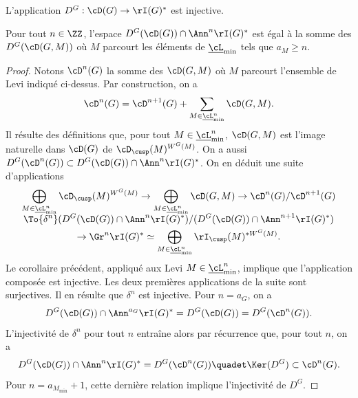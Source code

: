 \skpt
\begin{prop*}
\begin{enumeratei}
\item\label{injectivitei}
L'application $D^G:\cD(G)\to \rI(G)^*$ est injective.

\item\label{injectiviteii}
Pour tout $n\in \ZZ$, l'espace $D^G(\cD(G))\cap \Ann^n\rI(G)^*$ est égal à la somme des $D^G(\cD(G,M))$ où $M$ parcourt les éléments de $\underline{\cL}_{\min}$ tels que $a_{M}\geq n$.
\end{enumeratei}
\end{prop*}

\begin{proof}
Notons $\cD^n(G)$ la somme des $\cD(G,M)$ où $M$ parcourt l'ensemble de Levi indiqué ci-dessus. Par construction, on a
\[
\cD^n(G)=\cD^{n+1}(G)+\sum_{M\in \underline{\cL}^n_{\min}}\cD(G,M).
\]
Il résulte des définitions que, pour tout $M\in \underline{\cL}^n_{\min}$, $\cD(G,M)$ est l'image naturelle dans $\cD(G)$ de $\cD_{\cusp}(M)^{W^G(M)}$.
On a aussi $D^G(\cD^n(G))\subset D^G(\cD(G))\cap \Ann^n\rI(G)^*$. On en déduit une suite d'applications
\begin{multline*}
\bigoplus_{M\in \underline{\cL}^n_{\min}} \cD_{\cusp}(M)^{W^G(M)}\to \bigoplus_{M\in \underline{\cL}^n_{\min}}\cD(G,M)\to \cD^n(G)/\cD^{n+1}(G)\\[-5pt]
\To{\delta^n} (D^G(\cD(G))\cap \Ann^n\rI(G)^*)/(D^G(\cD(G))\cap \Ann^{n+1}\rI(G)^*)\\
\to \Gr^n\rI(G)^*\simeq \bigoplus_{M\in \underline{\cL}^n_{\min}}\rI_{\cusp}(M)^{*W^G(M)}.
\end{multline*}
Le corollaire précédent, appliqué aux Levi $M\in\underline{\cL}_{\min}^n$, implique que l'application composée est injective. Les deux premières applications de la suite sont surjectives. Il en résulte que $\delta^{n}$ est injective. Pour $n=a_{G}$, on a
\[
D^G(\cD(G))\cap \Ann^{a_{G}}\rI(G)^*=D^G(\cD(G))=D^G(\cD^n(G)).
\]
L'injectivité de $\delta^{n}$ pour tout $n$ entraîne alors par récurrence que, pour tout $n$, on a
\[
D^G(\cD(G))\cap \Ann^n\rI(G)^*=D^G(\cD^n(G))\quadet \Ker(D^G)\subset \cD^n(G).
\]
Pour $n=a_{M_{\min}}+1$, cette dernière relation implique l'injectivité de $D^G$.
\end{proof}

